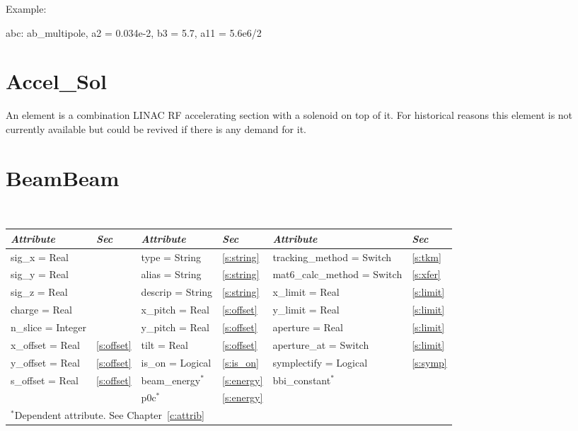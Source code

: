 Example:
\begin{example}
  abc: ab_multipole, a2 = 0.034e-2, b3 = 5.7, a11 = 5.6e6/2
\end{example}

\section{Accel\_Sol}
\label{s:accel_sol}

An  element is a combination LINAC RF accelerating
section with a solenoid on top of it. For historical reasons this
element is not currently available but could be revived if there is
any demand for it.

\section{BeamBeam}
\label{s:bbi}

\begin{center} 
\tt
\begin{tabular}{|l|l||l|l||l|l|} \hline
  {\sl Attribute} & {\sl Sec}  & {\sl Attribute} & {\sl Sec} & {\sl Attribute} & {\sl Sec} \\ \hline
  sig\_x   = Real       &                 & type = String    & \ref{s:string} & tracking\_method = Switch    & \ref{s:tkm}    \\ \hline
  sig\_y   = Real       &                 & alias = String   & \ref{s:string} & mat6\_calc\_method = Switch  & \ref{s:xfer}   \\ \hline
  sig\_z   = Real       &                 & descrip = String & \ref{s:string} & x\_limit    = Real           & \ref{s:limit}  \\ \hline
  charge   = Real       &                 & x\_pitch = Real  & \ref{s:offset} & y\_limit    = Real           & \ref{s:limit}  \\ \hline
  n\_slice = Integer    &                 & y\_pitch = Real  & \ref{s:offset} & aperture    = Real           & \ref{s:limit}  \\ \hline
  x\_offset = Real      & \ref{s:offset}  & tilt = Real      & \ref{s:offset} & aperture\_at = Switch        & \ref{s:limit}  \\ \hline
  y\_offset = Real      & \ref{s:offset}  & is\_on = Logical & \ref{s:is_on}  & symplectify = Logical        & \ref{s:symp}   \\ \hline
  s\_offset = Real      & \ref{s:offset}  & beam\_energy$^*$ & \ref{s:energy} & bbi\_constant$^*$            &                \\ \hline
                        &                 & p0c$^*$          & \ref{s:energy} &                              &                \\ \hline
  \multicolumn{6}{l}{\small $^*$Dependent attribute. See Chapter~\ref{c:attrib}} \\
\end{tabular}
\end{center}
\toffset

